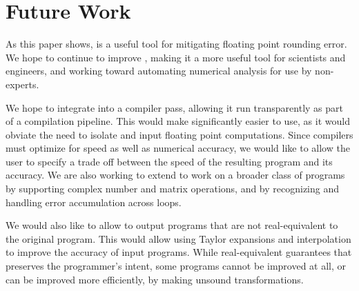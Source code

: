 \documentclass[paper.tex]{subfiles}
\begin{document}
\section{Future Work}
\label{sec:futurework}

As this paper shows, \casio is a useful tool
  for mitigating floating point rounding error.
We hope to continue to improve \casio,
  making it a more useful tool for scientists and engineers,
  and working toward automating numerical analysis
  for use by non-experts.

We hope to integrate \casio
  into a compiler pass, allowing it run transparently
  as part of a compilation pipeline.
This would make \casio significantly easier to use,
  as it would obviate the need to isolate and input floating point computations.
Since compilers must optimize for speed as well as numerical accuracy,
  we would like to allow the user to specify a trade off
  between the speed of the resulting program and its accuracy.
We are also working to extend \casio
  to work on a broader class of programs
  by supporting complex number and matrix operations,
  and by recognizing and handling error accumulation
  across loops.

We would also like to allow \casio to output programs
  that are not real-equivalent to the original program.
This would allow using Taylor expansions and interpolation
  to improve the accuracy of input programs.
While real-equivalent guarantees that \casio preserves
  the programmer's intent,
  some programs cannot be improved at all,
  or can be improved more efficiently,
  by making unsound transformations.
\end{document}
